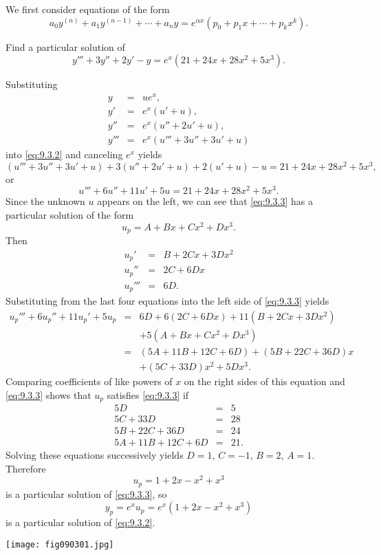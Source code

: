 \documentclass{ximera}
\begin{document}
We  first consider  equations of the form
$$
a_0y^{(n)}+a_1y^{(n-1)}+\cdots+a_ny=e^{\alpha
x}\left(p_0+p_1x+\cdots+p_kx^k\right).
$$

\begin{example}\label{example:9.3.1}
Find a particular solution of
\begin{equation} \label{eq:9.3.2}
y'''+3y''+2y'-y=e^x(21+24x+28x^2+5x^3).
\end{equation}


\begin{explanation} Substituting
\begin{eqnarray*}
y&=&ue^x,\\ y'&=&e^x(u'+u),\\
y''&=&e^x(u''+2u'+u),\\
y'''&=&e^x(u'''+3u''+3u'+u)
\end{eqnarray*}
into \eqref{eq:9.3.2} and canceling $e^x$ yields
$$
(u'''+3u''+3u'+u)+3(u''+2u'+u)+2(u'+u)-u
=21+24x+28x^2+5x^3,
$$
or
\begin{equation} \label{eq:9.3.3}
u'''+6u''+11u'+5u=21+24x+28x^2+5x^3.
\end{equation}
Since the unknown $u$ appears on the left, we can see that
\eqref{eq:9.3.3} has a particular solution of the form
$$
u_p=A+Bx+Cx^2+Dx^3.
$$
Then
\begin{eqnarray*}
u_p'&=&B+2Cx+3Dx^2\\
u_p''&=&2C+6Dx\\
u_p'''&=&6D.
\end{eqnarray*}
Substituting from the last four equations  into the left side of
\eqref{eq:9.3.3} yields
\begin{eqnarray*}
u_p'''+6u_p''+11u_p'+5u_p&=&6D+6(2C+6Dx)+11(B+2Cx+3Dx^2)\\
&&+5(A+Bx+Cx^2+Dx^3)\\
&=&(5A+11B+12C+6D)+(5B+22C+36D)x\\&&+(5C+33D)x^2+5Dx^3.
\end{eqnarray*}
Comparing coefficients of like powers of $x$ on the right sides of
this equation and \eqref{eq:9.3.3} shows that $u_p$ satisfies \eqref{eq:9.3.3}
if
$$
\begin{array}{rcr}
5D&=&5\\
5C+33D&=&28\\
5B+22C+36D&=&24\\
5A+11B+12C+6D&=&21.
\end{array}
$$
Solving these equations successively yields $D=1$, $C=-1$, $B=2$, $A=1$.
Therefore
$$
u_p=1+2x-x^2+x^3
$$
is a particular solution of  \eqref{eq:9.3.3}, so
$$
y_p=e^xu_p=e^x(1+2x-x^2+x^3)
$$
is a particular solution of  \eqref{eq:9.3.2}.


\begin{image}
 \texttt{[image: fig090301.jpg]} 
\end{image}

\end{explanation}
\end{example}
\end{document}
